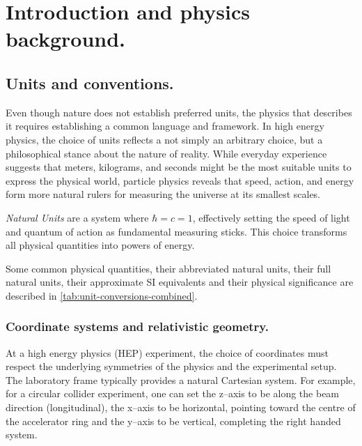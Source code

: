 \chapter{Introduction and physics background.}
\section{Units and conventions.}
\label{sec:units_and_conventions}
    Even though nature does not establish preferred units, the physics that describes it requires establishing a common language and framework.
    In high energy physics, the choice of units reflects a not simply an arbitrary choice, but a philosophical stance about the nature of reality.
    While everyday experience suggests that meters, kilograms, and seconds might be the most suitable units to express the physical world, particle physics reveals that speed, action, and energy form more natural rulers for measuring the universe at its smallest scales.
    \begin{definition}
        \emph{Natural Units} are a system where \(\hbar = c = 1\), effectively setting the speed of light and quantum of action as fundamental measuring sticks.
        This choice transforms all physical quantities into powers of energy.
    \end{definition}
    

    Some common physical quantities, their abbreviated natural units, their full natural units, their approximate SI equivalents and their physical significance are described in \cref{tab:unit-conversions-combined}.
    
\subsection{Coordinate systems and relativistic geometry.}
    At a high energy physics (HEP) experiment, the choice of coordinates must respect the underlying symmetries of the physics and the experimental setup.
    The laboratory frame typically provides a natural Cartesian system.
    For example, for a circular collider experiment, one can set the  z--axis to be along the beam direction (longitudinal), the x--axis to be horizontal, pointing toward the centre of the accelerator ring and the y--axis to be vertical, completing the right handed system.

